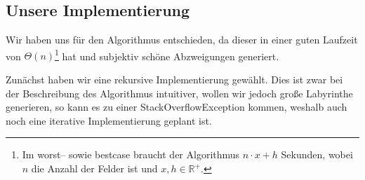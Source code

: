 \documentclass[12pt]{article}
\begin{document}
        \subsection{Unsere Implementierung}\label{subsec:unsere-implementierung}
            \begin{figure}[ht!]
                
            \end{figure}
            Wir haben uns für den  Algorithmus entschieden, da dieser in einer guten Laufzeit von $\Theta(n)$\footnote{Im worst-- sowie bestcase braucht der Algorithmus $n\cdot x+h$ Sekunden, wobei $n$ die Anzahl der Felder ist und $x,h\in\mathbb{R}^+$.} hat und subjektiv schöne Abzweigungen generiert.


            Zunächst haben wir eine rekursive Implementierung gewählt.
            Dies ist zwar bei der Beschreibung des Algorithmus intuitiver, wollen wir jedoch große Labyrinthe generieren, so kann es zu einer StackOverflowException kommen, weshalb auch noch eine iterative Implementierung geplant ist.
\end{document}
